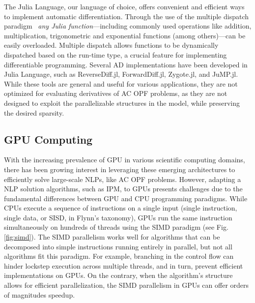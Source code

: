 The Julia Language, our language of choice, offers convenient and
efficient ways to implement automatic differentiation. Through the use
of the multiple dispatch paradigm~\cite{bezanson2017julia} \textit{any
Julia function}---including commonly used operations like addition,
multiplication, trigonometric and exponential functions (among
others)---can be easily overloaded. Multiple dispatch allows functions
to be dynamically dispatched based on the run-time type, a crucial
feature for implementing differentiable programming. Several AD
implementations have been developed in Julia Language, such as
ReverseDiff.jl, ForwardDiff.jl, Zygote.jl, and JuMP.jl. While these
tools are general and useful for various applications, they are not
optimized for evaluating derivatives of AC OPF problems, as they are
not designed to exploit the parallelizable structures in the model,
while preserving the desired sparsity.


\subsection{GPU Computing}\label{sec:gpu}
With the increasing prevalence of GPU in various scientific computing
domains, there has been growing interest in leveraging these emerging
architectures to efficiently solve large-scale NLPs, like AC OPF problems.
However, adapting a NLP solution algorithms,
such as IPM, to GPUs presents challenges due to the fundamental
differences between GPU and CPU programming paradigms. While CPUs
execute a sequence of instructions on a single input (single
instruction, single data, or SISD, in Flynn's taxonomy), GPUs run the
same instruction simultaneously on hundreds of threads using the SIMD
paradigm (see Fig. \ref{fig:simd}). The SIMD parallelism works well
for algorithms that can be decomposed into simple instructions running
entirely in parallel, but not all algorithms fit this
paradigm. For example, branching in the control flow can hinder
lockstep execution across multiple threads, and in turn, prevent
efficient implementations on GPUs. On the contrary, when the
algorithm's structure allows for efficient parallelization, the SIMD
parallelism in GPUs can offer orders of magnitudes speedup.

